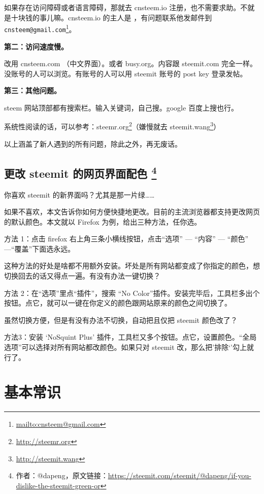 \documentclass[]{ctexbook}
\renewcommand{\href}[2]{#2\footnote{\url{#1}}}
\begin{document}
如果存在访问障碍或者语言障碍，那就去 cnsteem.io 注册，也不需要求助。不就是十块钱的事儿嘛。cnsteem.io 的主人是 \citet{skenan}，有问题联系他发邮件到 \href{mailto:cnsteem@gmail.com}{\nolinkurl{cnsteem@gmail.com}}。

\textbf{第二：访问速度慢。}

改用 cnsteem.com （中文界面）。或者 busy.org。内容跟 steemit.com 完全一样。没账号的人可以浏览。有账号的人可以用 steemit 账号的 post key 登录发帖。

\textbf{第三：其他问题。}

steem 网站顶部都有搜索栏。输入关键词，自己搜。google 百度上搜也行。

系统性阅读的话，可以参考：\href{http://steemr.org}{steemr.org}（嫌慢就去 \href{http://steemit.wang}{steemit.wang}）

以上涵盖了新人遇到的所有问题，除此之外，再无废话。

\hypertarget{change-color}{%
\section[更改 steemit 的网页界面配色 ]{\texorpdfstring{更改 steemit 的网页界面配色 \footnote{作者：@dapeng，原文链接：\url{https://steemit.com/steemit/@dapeng/if-you-dislike-the-steemit-green-or}}}{更改 steemit 的网页界面配色 }}\label{change-color}}

你喜欢 steemit 的新界面吗？尤其是那一片绿\ldots{}\ldots{}

如果不喜欢，本文告诉你如何方便快捷地更改。目前的主流浏览器都支持更改网页的默认颜色。本文就以 Firefox 为例，给出三种方法，任你选。

方法 1：点击 firefox 右上角三条小横线按钮，点击``选项'' --- ``内容'' --- ``颜色'' ---``覆盖''下面选永远。

这种方法的好处是啥都不用额外安装。坏处是所有网站都变成了你指定的颜色，想切换回去的话又得点一遍。有没有办法一键切换？

方法 2：在``选项''里点``插件''，搜索 ``No Color''插件。安装完毕后，工具栏多出个按钮。点它，就可以一键在你定义的颜色跟网站原来的颜色之间切换了。

虽然切换方便，但是有没有办法不切换，自动把且仅把 steemit 颜色改了？

方法3：安装 `NoSquint Plus' 插件，工具栏又多个按钮。点它，设置颜色。``全局选项''可以选择对所有网站都改颜色。如果只对 steemit 改，那么把'排除`'勾上就行了。

\hypertarget{jbcsp_}{%
\chapter{基本常识}\label{jbcsp_}}
\end{document}
